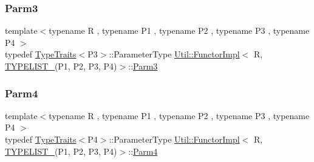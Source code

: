 \subsubsection{\texorpdfstring{Parm3}{Parm3}\hspace{0.1cm}{\footnotesize\ttfamily [3/3]}}
{\footnotesize\ttfamily template$<$typename R , typename P1 , typename P2 , typename P3 , typename P4 $>$ \\
typedef \mbox{\hyperlink{classUtil_1_1TypeTraits}{Type\+Traits}}$<$P3$>$\+::Parameter\+Type \mbox{\hyperlink{classUtil_1_1FunctorImpl}{Util\+::\+Functor\+Impl}}$<$ R, \mbox{\hyperlink{adat__devel__install_2include_2adat_2typelist_8h_a7a156c571ab21a16b0495e1c882a07fa}{T\+Y\+P\+E\+L\+I\+S\+T\+\_}}(P1, P2, P3, P4)$>$\+::\mbox{\hyperlink{structUtil_1_1Private_1_1FunctorImplBase_a052148e627fd4caecbcffdbdf1033dbb}{Parm3}}}

\mbox{\label{classUtil_1_1FunctorImpl_3_01R_00_01TYPELIST__4_07P1_00_01P2_00_01P3_00_01P4_08_4_a7375a2710126cb146191bd1c17af2f1d}} 
\subsubsection{\texorpdfstring{Parm4}{Parm4}\hspace{0.1cm}{\footnotesize\ttfamily [1/3]}}
{\footnotesize\ttfamily template$<$typename R , typename P1 , typename P2 , typename P3 , typename P4 $>$ \\
typedef \mbox{\hyperlink{classUtil_1_1TypeTraits}{Type\+Traits}}$<$P4$>$\+::Parameter\+Type \mbox{\hyperlink{classUtil_1_1FunctorImpl}{Util\+::\+Functor\+Impl}}$<$ R, \mbox{\hyperlink{adat__devel__install_2include_2adat_2typelist_8h_a7a156c571ab21a16b0495e1c882a07fa}{T\+Y\+P\+E\+L\+I\+S\+T\+\_}}(P1, P2, P3, P4)$>$\+::\mbox{\hyperlink{structUtil_1_1Private_1_1FunctorImplBase_a1ad7fe3f243480c44a610927ebe76762}{Parm4}}}

\mbox{\label{classUtil_1_1FunctorImpl_3_01R_00_01TYPELIST__4_07P1_00_01P2_00_01P3_00_01P4_08_4_a7375a2710126cb146191bd1c17af2f1d}} 
